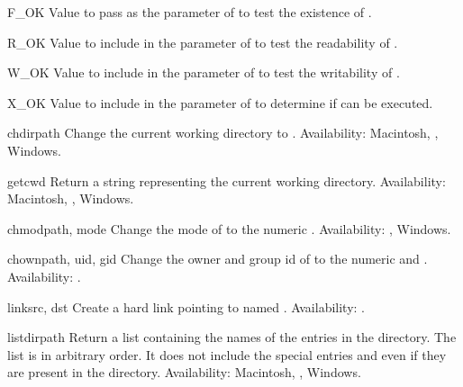 \begin{datadesc}{F_OK}
  Value to pass as the  parameter of  to
  test the existence of .
\end{datadesc}

\begin{datadesc}{R_OK}
  Value to include in the  parameter of 
  to test the readability of .
\end{datadesc}

\begin{datadesc}{W_OK}
  Value to include in the  parameter of 
  to test the writability of .
\end{datadesc}

\begin{datadesc}{X_OK}
  Value to include in the  parameter of 
  to determine if  can be executed.
\end{datadesc}

\begin{funcdesc}{chdir}{path}
Change the current working directory to .
Availability: Macintosh, \UNIX{}, Windows.
\end{funcdesc}

\begin{funcdesc}{getcwd}{}
Return a string representing the current working directory.
Availability: Macintosh, \UNIX{}, Windows.
\end{funcdesc}

\begin{funcdesc}{chmod}{path, mode}
Change the mode of  to the numeric .
Availability: \UNIX{}, Windows.
\end{funcdesc}

\begin{funcdesc}{chown}{path, uid, gid}
Change the owner and group id of  to the numeric 
and .
Availability: \UNIX{}.
\end{funcdesc}

\begin{funcdesc}{link}{src, dst}
Create a hard link pointing to  named .
Availability: \UNIX{}.
\end{funcdesc}

\begin{funcdesc}{listdir}{path}
Return a list containing the names of the entries in the directory.
The list is in arbitrary order.  It does not include the special
entries  and  even if they are present in the
directory.
Availability: Macintosh, \UNIX{}, Windows.
\end{funcdesc}

